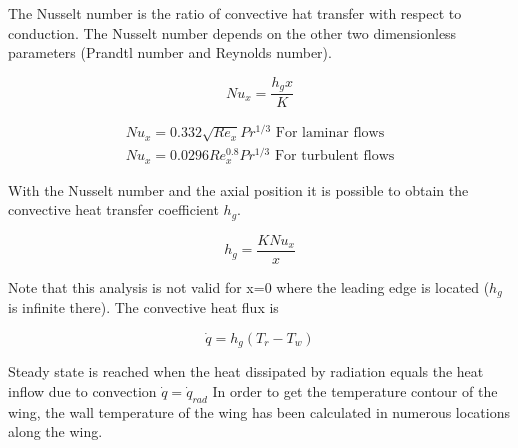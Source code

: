 The Nusselt number is the ratio of convective hat transfer with respect to conduction. The Nusselt number depends on the other two dimensionless parameters (Prandtl number and Reynolds number).

\begin{equation}
Nu_x=\frac{h_g x}{K}
\end{equation}

\begin{equation}
\begin{split}
Nu_x=0.332\sqrt{Re_x} Pr^{1/3}	\text{  For laminar flows} \\
Nu_x=0.0296Re_x^{0.8} Pr^{1/3}	\text{  For turbulent flows}
\end{split}
\end{equation}

With the Nusselt number and the axial position it is possible to obtain the convective heat transfer coefficient $h_g$.

\begin{equation}
h_g=\frac{K Nu_x}{x}
\end{equation}

Note that this analysis is not valid for x=0 where the leading edge is located ($h_g$ is infinite there).
The convective heat flux is 

\begin{equation}
\dot{q}=h_g (T_r-T_w)
\end{equation}


Steady state is reached when the heat dissipated by radiation equals the heat inflow due to convection $\dot{q}=\dot{q}_{rad}$
In order to get the temperature contour of the wing, the wall temperature of the wing has been calculated in numerous locations along the wing.
